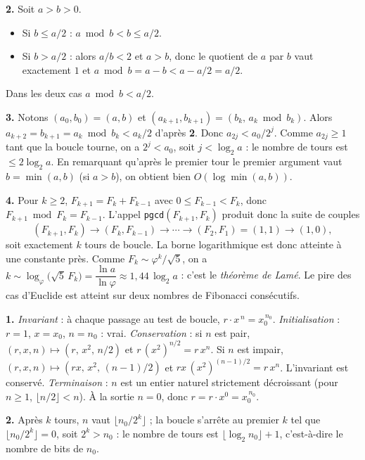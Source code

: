 \documentclass[11pt,a4paper]{article}
\begin{document}
\textbf{2.} Soit $a>b>0$.
\begin{itemize}[leftmargin=*,itemsep=1pt]
  \item Si $b\le a/2$ : $a\bmod b < b \le a/2$.
  \item Si $b>a/2$ : alors $a/b<2$ et $a>b$, donc le quotient de $a$ par $b$ vaut
        exactement $1$ et $a\bmod b = a-b < a - a/2 = a/2$.
\end{itemize}
Dans les deux cas $a \bmod b < a/2$.

\textbf{3.} Notons $(a_0,b_0)=(a,b)$ et $(a_{k+1},b_{k+1})=(b_k,\,a_k\bmod b_k)$.
Alors $a_{k+2}=b_{k+1}=a_k \bmod b_k < a_k/2$ d'après \textbf{2}.
Donc $a_{2j} < a_0/2^{j}$. Comme $a_{2j}\ge 1$ tant que la boucle tourne, on a
$2^{j}< a_0$, soit $j<\log_2 a$ : le nombre de tours est $\le 2\log_2 a$.
En remarquant qu'après le premier tour le premier argument vaut $b=\min(a,b)$ (si
$a>b$), on obtient bien $O(\log \min(a,b))$.

\textbf{4.} Pour $k\ge2$, $F_{k+1}=F_k+F_{k-1}$ avec $0\le F_{k-1}<F_k$, donc
$F_{k+1}\bmod F_k = F_{k-1}$. L'appel \texttt{pgcd}$(F_{k+1},F_k)$ produit donc la suite
de couples
\[
  (F_{k+1},F_k)\to(F_k,F_{k-1})\to\cdots\to(F_2,F_1)=(1,1)\to(1,0),
\]
soit exactement $k$ tours de boucle. La borne logarithmique est donc atteinte à une
constante près. Comme $F_k \sim \varphi^{k}/\sqrt5$, on a
$k \sim \log_\varphi\!\big(\sqrt5\,F_k\big) = \dfrac{\ln a}{\ln\varphi}
\approx 1{,}44\,\log_2 a$ : c'est le \emph{théorème de Lamé}. Le pire des cas d'Euclide
est atteint sur deux nombres de Fibonacci consécutifs.

\reponse
\textbf{1.} \emph{Invariant} : à chaque passage au test de boucle, $r\cdot x^{\,n}
= x_0^{\,n_0}$.
\emph{Initialisation} : $r=1$, $x=x_0$, $n=n_0$ : vrai.
\emph{Conservation} : si $n$ est pair, $(r,x,n)\mapsto (r,\,x^2,\,n/2)$ et
$r\,(x^2)^{n/2}=r\,x^{n}$. Si $n$ est impair, $(r,x,n)\mapsto(rx,\,x^2,\,(n-1)/2)$ et
$rx\,(x^2)^{(n-1)/2}= r\,x^{n}$. L'invariant est conservé.
\emph{Terminaison} : $n$ est un entier naturel strictement décroissant (pour $n\ge1$,
$\lfloor n/2\rfloor<n$). À la sortie $n=0$, donc $r = r\cdot x^{0} = x_0^{\,n_0}$.

\textbf{2.} Après $k$ tours, $n$ vaut $\lfloor n_0/2^{k}\rfloor$ ; la boucle s'arrête
au premier $k$ tel que $\lfloor n_0/2^{k}\rfloor = 0$, soit $2^{k}>n_0$ :
le nombre de tours est $\lfloor\log_2 n_0\rfloor+1$, c'est-à-dire le nombre de bits
de $n_0$.
\end{document}
